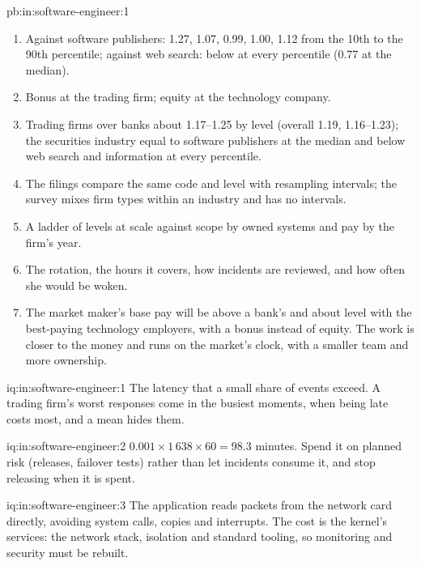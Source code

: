 \begin{solution}{pb:in:software-engineer:1}
\begin{enumerate}
\item Against software publishers: 1.27, 1.07, 0.99, 1.00, 1.12 from the 10th to the 90th percentile; against web search:
below at every percentile (0.77 at the median).
\item Bonus at the trading firm; equity at the technology company.
\item Trading firms over banks about 1.17--1.25 by level (overall 1.19, 1.16--1.23); the securities industry equal to
software publishers at the median and below web search and information at every percentile.
\item The filings compare the same code and level with resampling intervals; the survey mixes firm types within an
industry and has no intervals.
\item A ladder of levels at scale against scope by owned systems and pay by the firm's year.
\item The rotation, the hours it covers, how incidents are reviewed, and how often she would be woken.
\item The market maker's base pay will be above a bank's and about level with the best-paying technology employers, with a
bonus instead of equity. The work is closer to the money and runs on the market's clock, with a smaller team and more
ownership.
\end{enumerate}
\end{solution}

\begin{solution}{iq:in:software-engineer:1}
The latency that a small share of events exceed. A trading firm's worst responses come in the busiest moments, when being
late costs most, and a mean hides them.
\end{solution}

\begin{solution}{iq:in:software-engineer:2}
$0.001\times1\,638\times60=98.3$ minutes. Spend it on planned risk (releases, failover tests) rather than let incidents
consume it, and stop releasing when it is spent.
\end{solution}

\begin{solution}{iq:in:software-engineer:3}
The application reads packets from the network card directly, avoiding system calls, copies and interrupts. The cost is
the kernel's services: the network stack, isolation and standard tooling, so monitoring and security must be rebuilt.
\end{solution}


